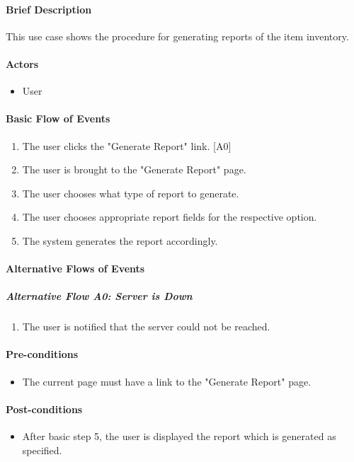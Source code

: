 \documentclass{article}
\begin{document}
\paragraph{Brief Description}
This use case shows the procedure for generating reports of the item inventory.

\paragraph{Actors}
\begin{itemize}
\item User
\end{itemize}

\paragraph{Basic Flow of Events}
\begin{enumerate}
\item The user clicks the "Generate Report" link. [A0]
\item The user is brought to the "Generate Report" page.
\item The user chooses what type of report to generate.
\item The user chooses appropriate report fields for the respective option.
\item The system generates the report accordingly.
\end{enumerate}

\paragraph{Alternative Flows of Events}

\subparagraph{Alternative Flow A0: Server is Down}
\begin{enumerate}
\item The user is notified that the server could not be reached.
\end{enumerate}

\paragraph{Pre-conditions}
\begin{itemize}
\item The current page must have a link to the "Generate Report" page.
\end{itemize}

\paragraph{Post-conditions}
\begin{itemize}
\item After basic step 5, the user is displayed the report which is generated as specified.
\end{itemize}
\end{document}
